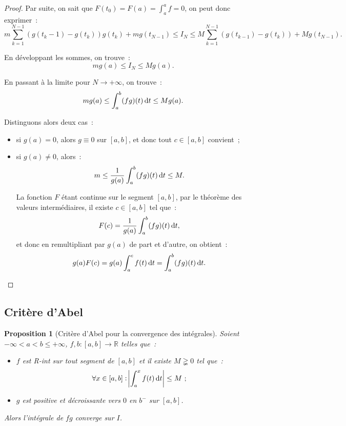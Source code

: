 \documentclass{report}
\newtheorem{prp}[thm]{Proposition}
\theoremstyle{definition}
\theoremstyle{remark}
\numberwithin{equation}{section}
\newcommand{\R}{\mathbb R}
\newcommand{\minfty}{{-\infty}}
\newcommand{\pinfty}{{+\infty}}
\begin{document}
\begin{proof}
			Par suite, on sait que $F(t_0) = F(a) = \int_a^a f = 0$, on peut donc exprimer~:
			\begin{equation}
				m\sum_{k=1}^{N-1}\left(g(t_k-1)-g(t_k)\right)g(t_k) + mg(t_{N-1}) \leq I_N \leq M\sum_{k=1}^{N-1}\left(g(t_{k-1}) - g(t_k)\right) + Mg(t_{N-1}).
			\end{equation}

			En développant les sommes, on trouve~:
			\begin{equation}
				mg(a) \leq I_N \leq Mg(a).
			\end{equation}

			En passant à la limite pour $N \to \pinfty$, on trouve~:
			\begin{equation}
				mg(a) \leq \int_a^b(fg)(t)\dif t \leq Mg(a).
			\end{equation}

			Distinguons alors deux cas~:
			\begin{itemize}
				\item si $g(a) = 0$, alors $g \equiv 0$ sur $[a, b]$, et donc tout $c \in [a, b]$ convient~;
				\item si $g(a) \neq 0$, alors~:
				\begin{equation}
					m \leq \frac 1{g(a)}\int_a^b(fg)(t)\dif t \leq M.
				\end{equation}

				La fonction $F$ étant continue sur le segment $[a, b]$, par le théorème des valeurs intermédiaires, il existe $c \in [a, b]$ tel que~:
				\begin{equation}
					F(c) = \frac 1{g(a)}\int_a^b(fg)(t)\dif t,
				\end{equation}
				et donc en remultipliant par $g(a)$ de part et d'autre, on obtient~:
				\begin{equation}
					g(a)F(c) = g(a)\int_a^cf(t)\dif t = \int_a^b(fg)(t)\dif t.
				\end{equation}
			\end{itemize}
			\end{proof}

		\subsection{Critère d'Abel}
			\begin{prp}[Critère d'Abel pour la convergence des intégrales] Soient $\minfty < a < b \leq \pinfty$, $f, b : [a, b] \to \R$ telles que~:
			\begin{itemize}
				\item $f$ est R-int sur tout segment de $[a, b]$ et il existe $M \gneqq 0$ tel que~:
				\begin{equation}
					\forall x \in [a, b] : \abs {\int_a^x f(t)\dif t} \leq M~;
				\end{equation}
				\item $g$ est positive et décroissante vers $0$ en $b^-$ sur $[a, b]$.
			\end{itemize}

			Alors l'intégrale de $fg$ converge sur $I$.
			\end{prp}
\end{document}

